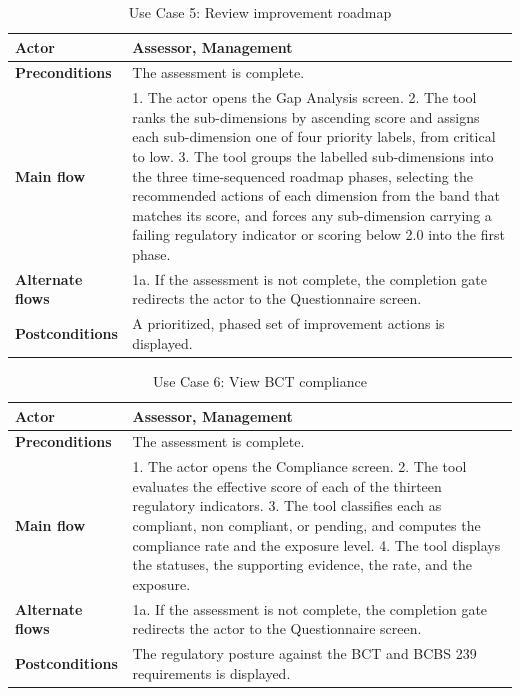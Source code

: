 \begin{table}[H]
\centering
\caption{Use Case 5: Review improvement roadmap} \label{tab:uc05}
\begin{tabular}{|p{3cm}|p{12cm}|}
\hline
\textbf{Actor} & Assessor, Management \\
\hline
\textbf{Preconditions} & The assessment is complete. \\
\hline
\textbf{Main flow} & 1. The actor opens the Gap Analysis screen. 2. The tool ranks the sub-dimensions by ascending score and assigns each sub-dimension one of four priority labels, from critical to low. 3. The tool groups the labelled sub-dimensions into the three time-sequenced roadmap phases, selecting the recommended actions of each dimension from the band that matches its score, and forces any sub-dimension carrying a failing regulatory indicator or scoring below 2.0 into the first phase. \\
\hline
\textbf{Alternate flows} & 1a. If the assessment is not complete, the completion gate redirects the actor to the Questionnaire screen. \\
\hline
\textbf{Postconditions} & A prioritized, phased set of improvement actions is displayed. \\
\hline
\end{tabular}

\end{table}

\begin{table}[H]
\centering
\caption{Use Case 6: View BCT compliance} \label{tab:uc06}
\begin{tabular}{|p{3cm}|p{12cm}|}
\hline
\textbf{Actor} & Assessor, Management \\
\hline
\textbf{Preconditions} & The assessment is complete. \\
\hline
\textbf{Main flow} & 1. The actor opens the Compliance screen. 2. The tool evaluates the effective score of each of the thirteen regulatory indicators. 3. The tool classifies each as compliant, non compliant, or pending, and computes the compliance rate and the exposure level. 4. The tool displays the statuses, the supporting evidence, the rate, and the exposure. \\
\hline
\textbf{Alternate flows} & 1a. If the assessment is not complete, the completion gate redirects the actor to the Questionnaire screen. \\
\hline
\textbf{Postconditions} & The regulatory posture against the BCT and BCBS 239 requirements is displayed. \\
\hline
\end{tabular}

\end{table}

